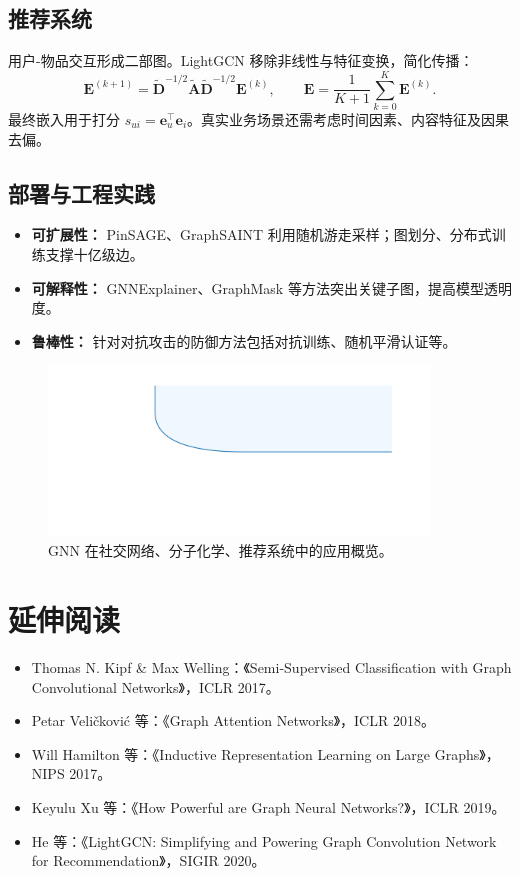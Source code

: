 \documentclass[UTF8,zihao=-4]{ctexart}
\begin{document}
\subsection{推荐系统}
用户-物品交互形成二部图。LightGCN 移除非线性与特征变换，简化传播：
\begin{equation}
  \mathbf{E}^{(k+1)} = \tilde{\mathbf{D}}^{-1/2} \tilde{\mathbf{A}} \tilde{\mathbf{D}}^{-1/2} \mathbf{E}^{(k)}, \qquad \mathbf{E} = \frac{1}{K+1} \sum_{k=0}^{K} \mathbf{E}^{(k)}.
\end{equation}
最终嵌入用于打分 $s_{ui} = \mathbf{e}_u^\top \mathbf{e}_i$。真实业务场景还需考虑时间因素、内容特征及因果去偏。

\subsection{部署与工程实践}
\begin{itemize}
  \item \textbf{可扩展性：} PinSAGE、GraphSAINT 利用随机游走采样；图划分、分布式训练支撑十亿级边。
  \item \textbf{可解释性：} GNNExplainer、GraphMask 等方法突出关键子图，提高模型透明度。
  \item \textbf{鲁棒性：} 针对对抗攻击的防御方法包括对抗训练、随机平滑认证等。
\end{itemize}

\begin{figure}[H]
  \centering
  \includegraphics[width=0.9\textwidth]{gnn_application_landscape.png}
  \caption{GNN 在社交网络、分子化学、推荐系统中的应用概览。}
  \label{fig:gnn_application_landscape_cn}
\end{figure}
\FloatBarrier

\section*{延伸阅读}
\begin{itemize}
  \item Thomas N. Kipf \& Max Welling：《Semi-Supervised Classification with Graph Convolutional Networks》，ICLR 2017。
  \item Petar Veličković 等：《Graph Attention Networks》，ICLR 2018。
  \item Will Hamilton 等：《Inductive Representation Learning on Large Graphs》，NIPS 2017。
  \item Keyulu Xu 等：《How Powerful are Graph Neural Networks?》，ICLR 2019。
  \item He 等：《LightGCN: Simplifying and Powering Graph Convolution Network for Recommendation》，SIGIR 2020。
\end{itemize}
\end{document}
